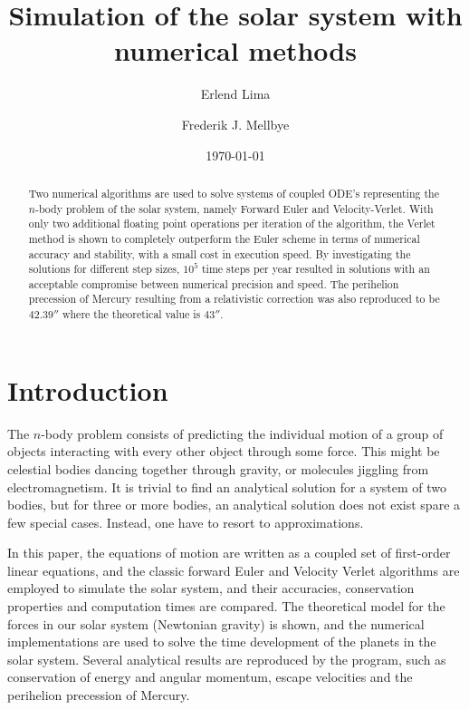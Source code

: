 \documentclass[aps,reprint]{revtex4-1}
\begin{document}
\title{Simulation of the solar system with numerical methods}
\author{Erlend Lima}
\author{Frederik J. Mellbye}
\date{\today}

\begin{abstract}
Two numerical algorithms are used to solve systems of coupled ODE's representing
the\(n\)-body problem of the solar system, namely Forward Euler and Velocity-Verlet. With
only two additional floating point operations per
iteration of the algorithm, the Verlet method is shown to completely outperform
the Euler scheme in terms of numerical accuracy and stability,
with a small cost in execution speed. By investigating the solutions for
different step sizes, $10^5$ time steps per year resulted in
solutions with an acceptable compromise between numerical precision and speed.
The perihelion precession of Mercury resulting from a relativistic correction
was also reproduced to be \(42.39''\) where the theoretical value is \(43''\).
\end{abstract}
\maketitle
\tableofcontents
\makeatletter
\let\toc@pre\relax
\let\toc@post\relax
\makeatother

\newpage

\section{Introduction}
\label{sec:introduction}
The \(n\)-body problem consists of predicting the individual motion of a group of objects
interacting with every other object through some force. This might be celestial
bodies dancing together through gravity, or molecules jiggling from
electromagnetism. It is trivial to find an analytical solution for a system of
two bodies, but for three or more bodies, an analytical solution does not exist
spare a few special cases. Instead, one have to resort to approximations.

In this paper, the equations of motion are written as a coupled set of first-order linear equations, and
the classic forward Euler and Velocity Verlet algorithms are employed to simulate the solar system,
and their accuracies, conservation properties and computation times are compared. The theoretical
model for the forces in our solar system (Newtonian gravity) is shown, and the numerical implementations
are used to solve the time development of the planets in the solar system. Several analytical results
are reproduced by the program, such as conservation of energy and angular momentum, escape velocities
and the perihelion precession of Mercury.
\end{document}
